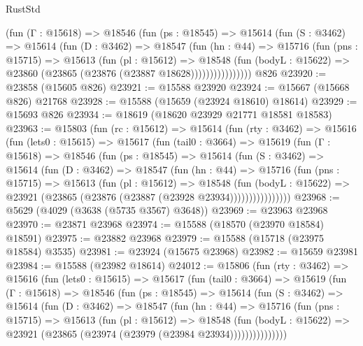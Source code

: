 \begin{lexlean}{RustStd}
\begin{coremodule}
              (fun (Γ : @15618) =>
              @18546
                (fun (ps : @18545) =>
                @15614
                  (fun (S : @3462) =>
                  @15614
                    (fun (D : @3462) =>
                    @18547
                      (fun (hn : @44) =>
                      @15716
                        (fun (pns : @15715) =>
                        @15613
                          (fun (pl : @15612) =>
                          @18548
                            (fun (bodyL : @15622) =>
                            @23860 (@23865 (@23876 (@23887 @18628))))))))))))))))
    @826
@23920 := @23858 (@15605 @826)
@23921 := @15588 @23920
@23924 := @15667 (@15668 @826) @21768
@23928 := @15588 (@15659 (@23924 @18610) @18614)
@23929 := @15693 @826
@23934 := @18619 (@18620 @23929 @21771 @18581 @18583)
@23963 := @15803
    (fun (rc : @15612) =>
    @15614
      (fun (rty : @3462) =>
      @15616
        (fun (lets0 : @15615) =>
        @15617
          (fun (tail0 : @3664) =>
          @15619
            (fun (Γ : @15618) =>
            @18546
              (fun (ps : @18545) =>
              @15614
                (fun (S : @3462) =>
                @15614
                  (fun (D : @3462) =>
                  @18547
                    (fun (hn : @44) =>
                    @15716
                      (fun (pns : @15715) =>
                      @15613
                        (fun (pl : @15612) =>
                        @18548
                          (fun (bodyL : @15622) =>
                          @23921 (@23865 (@23876 (@23887 (@23928 @23934))))))))))))))))
@23968 := @5629 (@4029 (@3638 (@5735 @3567) @3648))
@23969 := @23963 @23968
@23970 := @23871 @23968
@23974 := @15588 (@18570 (@23970 @18584) @18591)
@23975 := @23882 @23968
@23979 := @15588 (@15718 (@23975 @18584) @3535)
@23981 := @23924 (@15675 @23968)
@23982 := @15659 @23981
@23984 := @15588 (@23982 @18614)
@24012 := @15806
    (fun (rty : @3462) =>
    @15616
      (fun (lets0 : @15615) =>
      @15617
        (fun (tail0 : @3664) =>
        @15619
          (fun (Γ : @15618) =>
          @18546
            (fun (ps : @18545) =>
            @15614
              (fun (S : @3462) =>
              @15614
                (fun (D : @3462) =>
                @18547
                  (fun (hn : @44) =>
                  @15716
                    (fun (pns : @15715) =>
                    @15613
                      (fun (pl : @15612) =>
                      @18548
                        (fun (bodyL : @15622) =>
                        @23921 (@23865 (@23974 (@23979 (@23984 @23934)))))))))))))))

\end{coremodule}
\end{lexlean}
